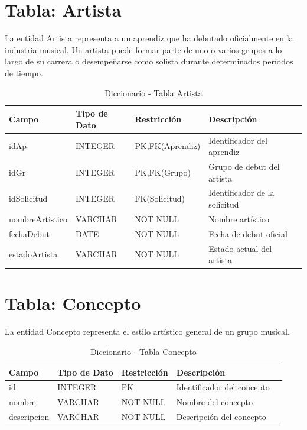 \documentclass[12pt,a4paper,spanish,oneside]{report}
\begin{document}
\section{Tabla: Artista}
La entidad Artista representa a un aprendiz que ha debutado oficialmente en la
industria musical. Un artista puede formar parte de uno o varios grupos a lo largo de su
carrera o desempeñarse como solista durante determinados períodos de tiempo.
\begin{table}[H]
\centering
\caption{Diccionario - Tabla Artista}
\begin{tabular}{|l|l|l|l|l|}
\hline
\textbf{Campo} & \textbf{Tipo de Dato} & \textbf{Restricción} & \textbf{Descripción} \\
\hline
idAp & INTEGER & PK,FK(Aprendiz) & Identificador del aprendiz\\
\hline
idGr & INTEGER & PK,FK(Grupo) & Grupo de debut del artista \\
\hline
idSolicitud & INTEGER & FK(Solicitud) & Identificador de la solicitud \\
\hline
nombreArtistico & VARCHAR & NOT NULL & Nombre artístico \\
\hline
fechaDebut & DATE & NOT NULL & Fecha de debut oficial \\
\hline
estadoArtista & VARCHAR & NOT NULL & Estado actual del artista \\
\hline
\end{tabular}
\end{table}
\section{Tabla: Concepto}
La entidad Concepto representa el estilo artístico general de un grupo musical.
\begin{table}[H]
\centering
\caption{Diccionario - Tabla Concepto}


\begin{tabular}{|l|l|l|l|l|}
\hline
\textbf{Campo} & \textbf{Tipo de Dato} & \textbf{Restricción} & \textbf{Descripción} \\
\hline
id & INTEGER & PK & Identificador del concepto \\
\hline
nombre & VARCHAR & NOT NULL & Nombre del concepto \\
\hline
descripcion & VARCHAR & NOT NULL & Descripción del concepto \\
\hline
\end{tabular}
\end{table}
\end{document}

